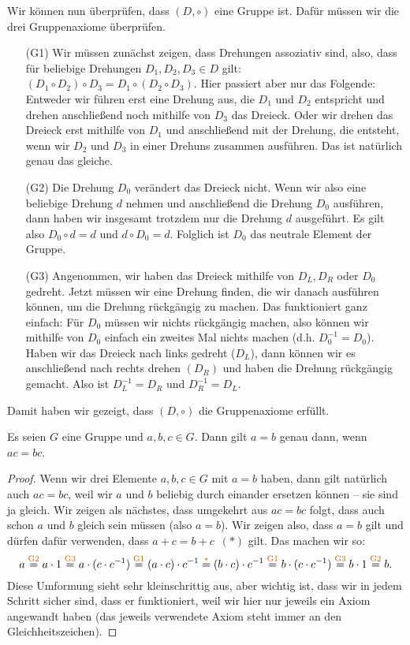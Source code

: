 \documentclass[../../main.tex]{subfiles}
\newcommand{\axiom}[1]{
    \ensuremath{
        \stackrel{\textcolor{orange!75!black}{\text{#1}}}{=}
    }
}
\begin{document}
\begin{advexample}
    Wir können nun überprüfen, dass $(D,\circ)$ eine Gruppe ist. Dafür müssen wir die drei Gruppenaxiome überprüfen.
    \begin{enumerate}
        \item[(G1)] Wir müssen zunächst zeigen, dass Drehungen assoziativ sind, also, dass für beliebige Drehungen $D_1,D_2,D_3\in D$ gilt: $(D_1\circ D_2)\circ D_3=D_1\circ (D_2\circ D_3)$. Hier passiert aber nur das Folgende: Entweder wir führen erst eine Drehung aus, die $D_1$ und $D_2$ entspricht und drehen anschließend noch mithilfe von $D_3$ das Dreieck. Oder wir drehen das Dreieck erst mithilfe von $D_1$ und anschließend mit der Drehung, die entsteht, wenn wir $D_2$ und $D_3$ in einer Drehuns zusammen ausführen. Das ist natürlich genau das gleiche.
        \item[(G2)] Die Drehung $D_0$ verändert das Dreieck nicht. Wenn wir also eine beliebige Drehung $d$ nehmen und anschließend die Drehung $D_0$ ausführen, dann haben wir insgesamt trotzdem nur die Drehung $d$ ausgeführt. Es gilt also $D_0\circ d=d$ und $d\circ D_0=d$. Folglich ist $D_0$ das neutrale Element der Gruppe.
        \item[(G3)] Angenommen, wir haben das Dreieck mithilfe von $D_L, D_R$ oder $D_0$ gedreht. Jetzt müssen wir eine Drehung finden, die wir danach ausführen können, um die Drehung rückgängig zu machen. Das funktioniert ganz einfach: Für $D_0$ müssen wir nichts rückgängig machen, also können wir mithilfe von $D_0$ einfach ein zweites Mal nichts machen (d.h. $D_0^{-1}=D_0$). Haben wir das Dreieck nach links gedreht ($D_L$), dann können wir es anschließend nach rechts drehen $(D_R)$ und haben die Drehung rückgängig gemacht. Also ist $D_L^{-1}=D_R$ und $D_R^{-1}=D_L$.
    \end{enumerate}
    Damit haben wir gezeigt, dass $(D,\circ)$ die Gruppenaxiome erfüllt.
\end{advexample}

\begin{theorem}[Kürzungsregel]
    Es seien $G$ eine Gruppe und $a,b,c \in G$. Dann gilt $a=b$ genau dann, wenn $ac=bc$.
\end{theorem}
\begin{proof}
     Wenn wir drei Elemente $a,b,c \in G$ mit $a=b$ haben, dann gilt natürlich auch $ac=bc$, weil wir $a$ und $b$ beliebig durch einander ersetzen können -- sie sind ja gleich. Wir zeigen als nächstes, dass umgekehrt aus $ac=bc$ folgt, dass auch schon $a$ und $b$ gleich sein müssen (also $a=b$). Wir zeigen also, dass $a=b$ gilt und dürfen dafür verwenden, dass \mbox{$a+c=b+c$ \textcolor{orange!75!black}{$(*)$}} gilt. Das machen wir so:
    \[a\axiom{G2}a\cdot 1\axiom{G3}a\cdot(c\cdot c^{-1})\axiom{G1}(a\cdot c)\cdot c^{-1}\axiom{$*$}(b\cdot c)\cdot c^{-1}\axiom{G1}b\cdot (c\cdot c^{-1})\axiom{G3}b\cdot 1\axiom{G2}b.\]
    Diese Umformung sieht sehr kleinschrittig aus, aber wichtig ist, dass wir in jedem Schritt sicher sind, dass er funktioniert, weil wir hier nur jeweils ein Axiom angewandt haben (das jeweils verwendete Axiom steht immer an den Gleichheitszeichen).
    
\end{proof}

\newpage
\pagecolor{white}
\end{document}
